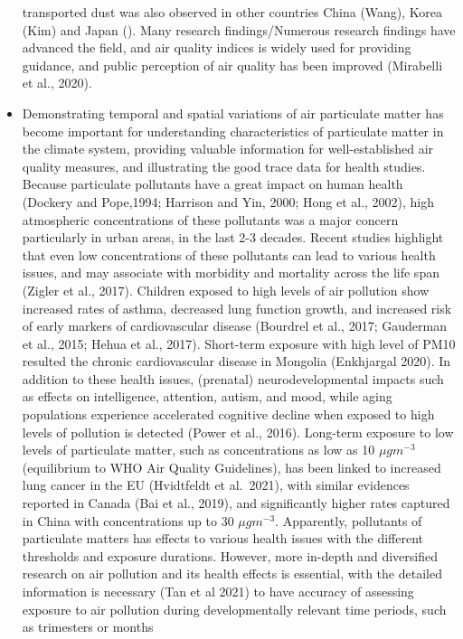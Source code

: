 \documentclass[
  11pt,
]{article}
\begin{document}
\begin{itemize}
  transported dust was also observed in other countries China (Wang),
  Korea (Kim) and Japan (). Many research findings/Numerous research
  findings have advanced the field, and air quality indices is widely
  used for providing guidance, and public perception of air quality has
  been improved (Mirabelli et al., 2020).
\item
  Demonstrating temporal and spatial variations of air particulate
  matter has become important for understanding characteristics of
  particulate matter in the climate system, providing valuable
  information for well-established air quality measures, and
  illustrating the good trace data for health studies. Because
  particulate pollutants have a great impact on human health (Dockery
  and Pope,1994; Harrison and Yin, 2000; Hong et al., 2002), high
  atmospheric concentrations of these pollutants was a major concern
  particularly in urban areas, in the last 2-3 decades. Recent studies
  highlight that even low concentrations of these pollutants can lead to
  various health issues, and may associate with morbidity and mortality
  across the life span (Zigler et al., 2017). Children exposed to high
  levels of air pollution show increased rates of asthma, decreased lung
  function growth, and increased risk of early markers of cardiovascular
  disease (Bourdrel et al., 2017; Gauderman et al., 2015; Hehua et al.,
  2017). Short-term exposure with high level of PM10 resulted the
  chronic cardiovascular disease in Mongolia (Enkhjargal 2020). In
  addition to these health issues, (prenatal) neurodevelopmental impacts
  such as effects on intelligence, attention, autism, and mood, while
  aging populations experience accelerated cognitive decline when
  exposed to high levels of pollution is detected (Power et al., 2016).
  Long-term exposure to low levels of particulate matter, such as
  concentrations as low as 10 \(\mu g m^{-3}\) (equilibrium to WHO Air
  Quality Guidelines), has been linked to increased lung cancer in the
  EU (Hvidtfeldt et al.~2021), with similar evidences reported in Canada
  (Bai et al., 2019), and significantly higher rates captured in China
  with concentrations up to 30 \(\mu g m^{-3}\). Apparently, pollutants
  of particulate matters has effects to various health issues with the
  different thresholds and exposure durations. However, more in-depth
  and diversified research on air pollution and its health effects is
  essential, with the detailed information is necessary (Tan et al 2021)
  to have accuracy of assessing exposure to air pollution during
  developmentally relevant time periods, such as trimesters or months

\end{itemize}
\end{document}

